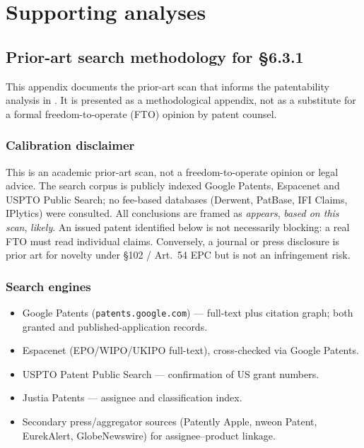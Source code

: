 \chapter{Supporting analyses}
\label{appendix:supporting-analyses}

\section{Prior-art search methodology for \S6.3.1}
\label{appendix:prior-art-search}

This appendix documents the prior-art scan that informs the patentability analysis in . It is presented as a methodological appendix, not as a substitute for a formal freedom-to-operate (FTO) opinion by patent counsel.

\subsection*{Calibration disclaimer}

This is an academic prior-art scan, not a freedom-to-operate opinion or legal advice. The search corpus is publicly indexed Google Patents, Espacenet and USPTO Public Search; no fee-based databases (Derwent, PatBase, IFI Claims, IPlytics) were consulted. All conclusions are framed as \emph{appears}, \emph{based on this scan}, \emph{likely}. An issued patent identified below is not necessarily blocking: a real FTO must read individual claims. Conversely, a journal or press disclosure is prior art for novelty under \S102 / Art.~54 EPC but is not an infringement risk.

\subsection*{Search engines}

\begin{itemize}
    \item Google Patents (\texttt{patents.google.com}) --- full-text plus citation graph; both granted and published-application records.
    \item Espacenet (EPO/WIPO/UKIPO full-text), cross-checked via Google Patents.
    \item USPTO Patent Public Search --- confirmation of US grant numbers.
    \item Justia Patents --- assignee and classification index.
    \item Secondary press/aggregator sources (Patently Apple, nweon Patent, EurekAlert, GlobeNewswire) for assignee--product linkage.
\end{itemize}

